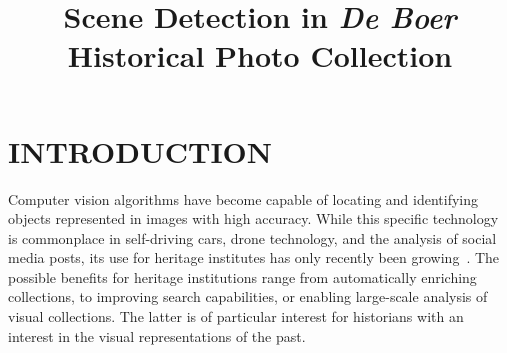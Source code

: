 \documentclass[a4paper,twoside]{article}
\begin{document}
\title{Scene Detection in \textit{De Boer} Historical Photo Collection}

\author{
\affiliation{}
\email{}
}



\onecolumn \maketitle \normalsize \setcounter{footnote}{0} \vfill

\section{INTRODUCTION}
\label{sec:introduction}

\noindent Computer vision algorithms have become capable of locating and identifying objects represented in images with high accuracy.
While this specific technology is commonplace in self-driving cars, drone technology, and the analysis of social media posts, its use for heritage institutes has only recently been growing~\cite{bhargav_deep_2019,bell_computing_2018,mager_visual_2020,niebling_analyzing_2020}. 
The possible benefits for heritage institutions range from automatically enriching collections, to improving search capabilities, or enabling large-scale analysis of visual collections. 
The latter is of particular interest for historians with an interest in the visual representations of the past.
\end{document}
